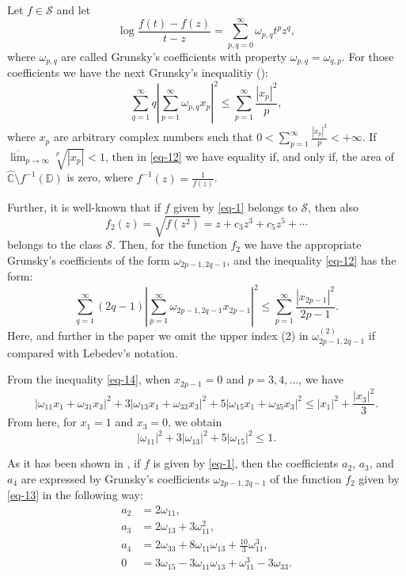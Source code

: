 \documentclass{amsart}
\newcommand{\D}{{\mathbb D}}
\def\be{\begin{equation}}
\def\ee{\end{equation}}
\begin{document}
\medskip

Let $f \in \mathcal{S}$ and let
\[
\log\frac{f(t)-f(z)}{t-z}=\sum_{p,q=0}^{\infty}\omega_{p,q}t^{p}z^{q},
\]
where $\omega_{p,q}$ are called Grunsky's coefficients with property $\omega_{p,q}=\omega_{q,p}$.
For those coefficients we have the next Grunsky's inequalitiy (\cite{duren,Lebedev}):
\be\label{eq-12}
\sum_{q=1}^{\infty}q \left|\sum_{p=1}^{\infty}\omega_{p,q}x_{p}\right|^{2}\leq \sum_{p=1}^{\infty}\frac{|x_{p}|^{2}}{p},
\ee
where $x_{p}$ are arbitrary complex numbers such that $0< \sum_{p=1}^{\infty}\frac{|x_{p}|^{2}}{p}< +\infty$. If $\overline{\lim}_{p\to\infty} \sqrt[p]{|x_p|}<1$, then in \eqref{eq-12} we have equality if, and only if, the area of $\widehat{\mathbb{C}} \setminus f^{-1}(\D)$ is zero, where $f^{-1}(z)= \frac{1}{f(z)}$.

\medskip

Further, it is well-known that if $f$ given by \eqref{eq-1}
belongs to $\mathcal{S}$, then also
\be\label{eq-13}
f_{2}(z)=\sqrt{f(z^{2})}=z +c_{3}z^3+c_{5}z^{5}+\cdots
\ee
belongs to the class $\mathcal{S}$. Then, for the function $f_{2}$ we have the appropriate Grunsky's
coefficients of the form $\omega_{2p-1,2q-1}$, and the inequality \eqref{eq-12} has the form:
\be\label{eq-14}
\sum_{q=1}^{\infty}(2q-1) \left|\sum_{p=1}^{\infty}\omega_{2p-1,2q-1}x_{2p-1}\right|^{2}\leq \sum_{p=1}^{\infty}\frac{|x_{2p-1}|^{2}}{2p-1}.
\ee
Here, and further in the paper we omit the upper index (2) in  $\omega_{2p-1,2q-1}^{(2)}$ if compared with Lebedev's notation.

\medskip

From the inequality \eqref{eq-14}, when $x_{2p-1}=0$ and $p=3,4,\ldots$, we have
\[
|\omega_{11} x_1 +\omega_{31} x_3 |^2 +3|\omega_{13} x_1 +\omega_{33} x_3 |^2 + 5|\omega_{15} x_1 +\omega_{35} x_3 |^2 \le |x_1|^2+\frac{|x_3|^2}{3}.
\]
 From here, for $x_1=1$ and $x_3=0$, we obtain
\begin{equation}\label{eq-16}
  |\omega_{11}|^2 + 3 |\omega_{13}|^2 + 5|\omega_{15}|^2 \leq1.
\end{equation}

\medskip

As it has been shown in \cite[p. 57]{Lebedev}, if $f$ is given by \eqref{eq-1}, then the coefficients $a_{2}$, $ a_{3}$, and $ a_{4}$  are expressed by Grunsky's coefficients  $\omega_{2p-1,2q-1}$ of the function $f_{2}$ given by
\eqref{eq-13} in the following way:
\begin{equation}\label{eq-17}
\begin{split}
a_{2}&=2\omega _{11},\\
a_{3}&=2\omega_{13}+3\omega_{11}^{2}, \\
a_{4}&=2\omega_{33}+8\omega_{11}\omega_{13}+\frac{10}{3}\omega_{11}^{3},\\
0&=3\omega_{15}-3\omega_{11}\omega_{13}+\omega_{11}^{3}-3\omega_{33}.
\end{split}
\end{equation}
\end{document}
